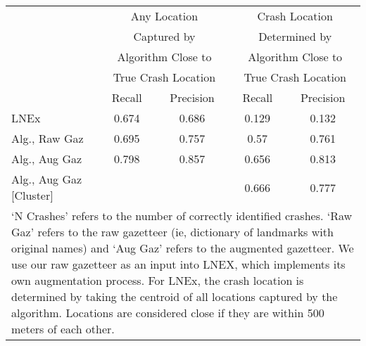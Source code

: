 \begin{tabular}{l cc | cc} \hline  & \multicolumn{2}{c|}{Any Location} & \multicolumn{2}{c}{Crash Location } \\  & \multicolumn{2}{c|}{Captured by} & \multicolumn{2}{c}{Determined by} \\  & \multicolumn{2}{c|}{Algorithm Close to} & \multicolumn{2}{c}{Algorithm Close to} \\  & \multicolumn{2}{c|}{True Crash Location} & \multicolumn{2}{c}{True Crash Location} \\  \hline  & Recall & Precision & Recall & Precision \\ \hline LNEx & 0.674  & 0.686  & 0.129  & 0.132  \\ Alg., Raw Gaz & 0.695  & 0.757  & 0.57  & 0.761  \\ Alg., Aug Gaz & 0.798  & 0.857  & 0.656  & 0.813  \\ Alg., Aug Gaz [Cluster] &  & & 0.666  & 0.777  \\ \hline \multicolumn{5}{p{8cm}}{`N Crashes' refers to the number of correctly 
    identified crashes. `Raw Gaz' refers to the raw gazetteer (ie, dictionary of 
    landmarks with original names) and `Aug Gaz' refers to the augmented gazetteer. 
    We use our raw gazetteer as an input into LNEX, which implements its own augmentation
    process. For LNEx, the crash location is determined by taking the centroid of all 
    locations captured by the algorithm. Locations are considered close if they are 
    within 500 meters of each other.} \end{tabular} 